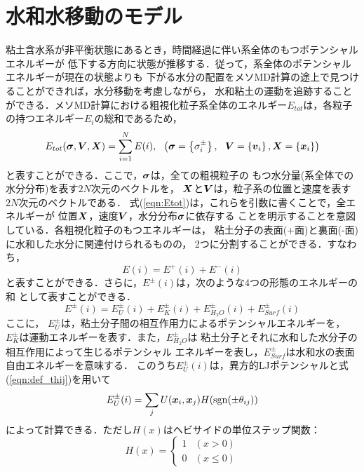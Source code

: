 \section{水和水移動のモデル}
粘土含水系が非平衡状態にあるとき，時間経過に伴い系全体のもつポテンシャルエネルギーが
低下する方向に状態が推移する．従って，系全体のポテンシャルエネルギーが現在の状態よりも
下がる水分の配置をメソMD計算の途上で見つけることができれば，水分移動を考慮しながら，
水和粘土の運動を追跡することができる．メソMD計算における粗視化粒子系全体のエネルギー$E_{tot}$は，各粒子の持つエネルギー$E_i$の総和であるため，
\begin{equation}
	E_{tot}(\fat{\sigma},\fat{V},\fat{X})=\sum_{i=1}^{N}E(i), 
	 \ \ 
	 \left( \fat{\sigma}=\left\{ \sigma^{\pm}_i \right\}
	 ,
	\ \
	 \fat{V}=\left\{ \fat{v}_i\right\}
, \fat{X}=\left\{\fat{x}_i \right\} 
	 \right)
	\label{eqn:Etot}
\end{equation}
と表すことができる．ここで，$\mbox{\boldmath $\sigma$}$は，全ての粗視粒子の
もつ水分量(系全体での水分分布)を表す$2N$次元のベクトルを，
$\mbox{\boldmath $X$}$と$\mbox{\boldmath $V$}$は，粒子系の位置と速度を表す$2N$次元のベクトルである．
式(\ref{eqn:Etot})は，これらを引数に書くことで，全エネルギーが
位置$\mbox{\boldmath $X$}$，速度$\mbox{\boldmath $V$}$，水分分布$\mbox{\boldmath $\sigma$}$に依存する
ことを明示することを意図している．各粗視化粒子のもつエネルギーは，
粘土分子の表面(+面)と裏面(-面)に水和した水分に関連付けられるものの，
2つに分割することができる．すなわち，
\begin{equation}
	E(i)=E^+(i)+E^-(i)
	\label{eqn:sum_Epm}
\end{equation}
と表すことができる．さらに，$E^\pm(i)$は，次のような4つの形態のエネルギーの和
として表すことができる．
\begin{equation}
	E^\pm(i)=E^\pm_{U}(i)+E^\pm_K(i)+E^\pm_{H_2O}(i)+E^\pm_{Surf}(i)
	\label{eqn:Emodes}
\end{equation}
ここに，
$E^{\pm}_U$は，粘土分子間の相互作用力によるポテンシャルエネルギーを，
$E^\pm_K$は運動エネルギーを表す．また，$E^\pm_{H_2O}$は
粘土分子とそれに水和した水分子の相互作用によって生じるポテンシャル
エネルギーを表し，$E^\pm_{Surf}$は水和水の表面自由エネルギーを意味する．
このうち$E^\pm_U(i)$は，異方的LJポテンシャルと式(\ref{eqn:def_thij})を用いて
\begin{equation}
	E_U^\pm(i)=\sum_{j} U(\mbox{\boldmath $x$}_i,\mbox{\boldmath $x$}_j)H({\rm sgn}(\pm \theta_{ij}))
	\label{eqn:def_EU}
\end{equation}
によって計算できる．ただし$H(x)$はヘビサイドの単位ステップ関数：
\begin{equation}
	H(x)=\left\{
	\begin{array}{cc}
		1& (x>0)  \\
		0& (x\leq 0) 
	\end{array}
	\right.
	\label{eqn:Step_func}
\end{equation}
